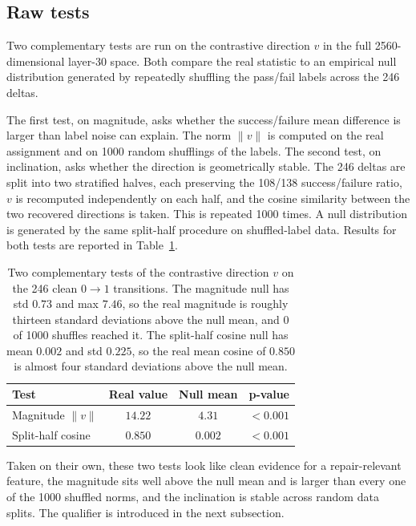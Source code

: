 \subsection{Raw tests}
\label{subsec:raw_tests}

Two complementary tests are run on the contrastive direction $v$ in the full 2560-dimensional layer-30 space. Both compare the real statistic to an empirical null distribution generated by repeatedly shuffling the pass/fail labels across the 246 deltas.

The first test, on magnitude, asks whether the success/failure mean difference is larger than label noise can explain. The norm $\|v\|$ is computed on the real assignment and on 1000 random shufflings of the labels. The second test, on inclination, asks whether the direction is geometrically stable. The 246 deltas are split into two stratified halves, each preserving the 108/138 success/failure ratio, $v$ is recomputed independently on each half, and the cosine similarity between the two recovered directions is taken. This is repeated 1000 times. A null distribution is generated by the same split-half procedure on shuffled-label data. Results for both tests are reported in Table~\ref{tab:raw_direction_tests}.

\begin{table}[h]
\centering
\begin{tabular}{lccc}
\toprule
Test                  & Real value & Null mean & p-value  \\
\midrule
Magnitude $\|v\|$     & $14.22$    & $4.31$    & $< 0.001$ \\
Split-half cosine     & $0.850$    & $0.002$   & $< 0.001$ \\
\bottomrule
\end{tabular}
\caption{Two complementary tests of the contrastive direction $v$ on the 246 clean $0 \to 1$ transitions. The magnitude null has std $0.73$ and max $7.46$, so the real magnitude is roughly thirteen standard deviations above the null mean, and 0 of 1000 shuffles reached it. The split-half cosine null has mean $0.002$ and std $0.225$, so the real mean cosine of $0.850$ is almost four standard deviations above the null mean.}
\label{tab:raw_direction_tests}
\end{table}

Taken on their own, these two tests look like clean evidence for a repair-relevant feature, the magnitude sits well above the null mean and is larger than every one of the 1000 shuffled norms, and the inclination is stable across random data splits. The qualifier is introduced in the next subsection.

